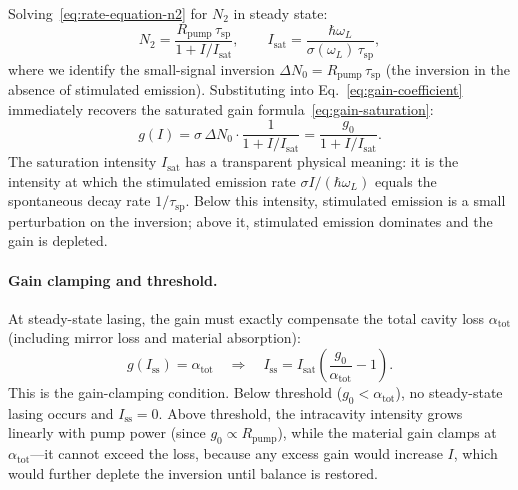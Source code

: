 Solving~\eqref{eq:rate-equation-n2} for $N_2$ in steady state:
\begin{equation}
 N_2 = \frac{R_{\mathrm{pump}}\,\tau_{\mathrm{sp}}}
 {1 + I/I_{\mathrm{sat}}},
 \qquad
 I_{\mathrm{sat}} = \frac{\hbar\omega_L}{\sigma(\omega_L)\,\tau_{\mathrm{sp}}},
 \label{eq:saturation-derivation}
\end{equation}
where we identify the small-signal inversion
$\Delta N_0 = R_{\mathrm{pump}}\,\tau_{\mathrm{sp}}$ (the inversion in
the absence of stimulated emission). Substituting into
Eq.~\eqref{eq:gain-coefficient} immediately recovers the saturated gain
formula~\eqref{eq:gain-saturation}:
\begin{equation}
 g(I) = \sigma\,\Delta N_0 \cdot \frac{1}{1 + I/I_{\mathrm{sat}}}
 = \frac{g_0}{1 + I/I_{\mathrm{sat}}}.
 \label{eq:gain-saturation-derived}
\end{equation}
The saturation intensity $I_{\mathrm{sat}}$ has a transparent physical
meaning: it is the intensity at which the stimulated emission rate
$\sigma I/(\hbar\omega_L)$ equals the spontaneous decay rate
$1/\tau_{\mathrm{sp}}$. Below this intensity, stimulated emission is a
small perturbation on the inversion; above it, stimulated emission
dominates and the gain is depleted.

\paragraph{Gain clamping and threshold.}
At steady-state lasing, the gain must exactly compensate the total cavity
loss $\alpha_{\mathrm{tot}}$ (including mirror loss and material
absorption):
\begin{equation}
 g(I_{\mathrm{ss}}) = \alpha_{\mathrm{tot}} \quad\Rightarrow\quad
 I_{\mathrm{ss}} = I_{\mathrm{sat}}\left(\frac{g_0}{\alpha_{\mathrm{tot}}} - 1\right).
 \label{eq:gain-clamping}
\end{equation}
This is the gain-clamping condition. Below threshold
($g_0 < \alpha_{\mathrm{tot}}$), no steady-state lasing occurs and
$I_{\mathrm{ss}} = 0$. Above threshold, the intracavity intensity
grows linearly with pump power (since $g_0 \propto R_{\mathrm{pump}}$),
while the material gain clamps at $\alpha_{\mathrm{tot}}$---it cannot
exceed the loss, because any excess gain would increase $I$, which would
further deplete the inversion until balance is restored.

